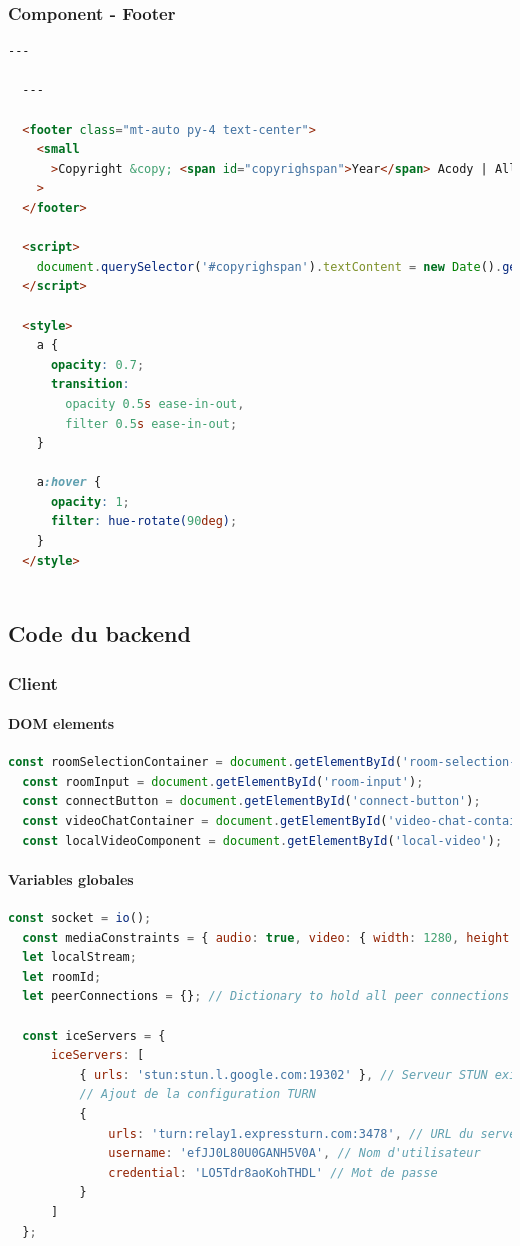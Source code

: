 \documentclass[12pt, a4paper, oneside]{thesis}
\newcommand{\subsubsubsection}[1]{\paragraph{#1}\mbox{}\par}
\begin{document}
\newpage
\subsubsection{Component - Footer}

\begin{lstlisting}[language=HTML, caption={Component - Footer}, label=Component - Footer]
  ---

  ---
  
  <footer class="mt-auto py-4 text-center">
    <small
      >Copyright &copy; <span id="copyrighspan">Year</span> Acody | All rights reserved</small
    >
  </footer>
  
  <script>
    document.querySelector('#copyrighspan').textContent = new Date().getFullYear().toString()
  </script>
  
  <style>
    a {
      opacity: 0.7;
      transition:
        opacity 0.5s ease-in-out,
        filter 0.5s ease-in-out;
    }
  
    a:hover {
      opacity: 1;
      filter: hue-rotate(90deg);
    }
  </style>
  
\end{lstlisting}

\newpage
\subsection{Code du backend}

\subsubsection{Client}

\subsubsubsection{DOM elements}

\begin{lstlisting}[language=JavaScript, caption={DOM Elements}, label=DOM Elements]
  const roomSelectionContainer = document.getElementById('room-selection-container');
  const roomInput = document.getElementById('room-input');
  const connectButton = document.getElementById('connect-button');
  const videoChatContainer = document.getElementById('video-chat-container');
  const localVideoComponent = document.getElementById('local-video');
\end{lstlisting}

\subsubsubsection{Variables globales}

\begin{lstlisting}[language=JavaScript, caption={Variables}, label=Variables]
  const socket = io();
  const mediaConstraints = { audio: true, video: { width: 1280, height: 720 } };
  let localStream;
  let roomId;
  let peerConnections = {}; // Dictionary to hold all peer connections
  
  const iceServers = {
      iceServers: [
          { urls: 'stun:stun.l.google.com:19302' }, // Serveur STUN existant
          // Ajout de la configuration TURN
          {
              urls: 'turn:relay1.expressturn.com:3478', // URL du serveur TURN
              username: 'efJJ0L80U0GANH5V0A', // Nom d'utilisateur
              credential: 'LO5Tdr8aoKohTHDL' // Mot de passe
          }
      ]
  };
\end{lstlisting}
\end{document}
